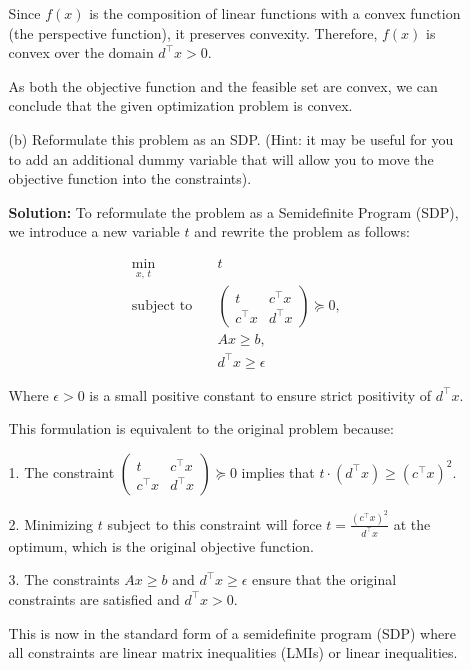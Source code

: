 \documentclass{article}
\begin{document}
\begin{enumerate}
\begin{enumerate}
    Since $f(x)$ is the composition of linear functions with a convex function (the perspective function), it preserves convexity. Therefore, $f(x)$ is convex over the domain $d^\top x > 0$.

    As both the objective function and the feasible set are convex, we can conclude that the given optimization problem is convex.

    \item[(b)] Reformulate this problem as an SDP. (Hint: it may be useful for you to add an additional dummy variable that will allow you to move the objective function into the constraints).
    
    \textbf{Solution:}
    To reformulate the problem as a Semidefinite Program (SDP), we introduce a new variable $t$ and rewrite the problem as follows:

    \begin{align*}
    \min_{x,\,t} &\quad t \\
    \text{subject to} &\quad 
    \begin{pmatrix}
    t & c^\top x \\
    c^\top x & d^\top x
    \end{pmatrix} \succeq 0, \\
    &\quad Ax \geq b, \\
    &\quad d^\top x \geq \epsilon
    \end{align*}

    Where $\epsilon > 0$ is a small positive constant to ensure strict positivity of $d^\top x$.

    This formulation is equivalent to the original problem because:

    1. The constraint $\begin{pmatrix} t & c^\top x \\ c^\top x & d^\top x \end{pmatrix} \succeq 0$ implies that $t \cdot (d^\top x) \geq (c^\top x)^2$.

    2. Minimizing $t$ subject to this constraint will force $t = \frac{(c^\top x)^2}{d^\top x}$ at the optimum, which is the original objective function.

    3. The constraints $Ax \geq b$ and $d^\top x \geq \epsilon$ ensure that the original constraints are satisfied and $d^\top x > 0$.

    This is now in the standard form of a semidefinite program (SDP) where all constraints are linear matrix inequalities (LMIs) or linear inequalities.
    \end{enumerate}
\end{enumerate}
\end{document}

